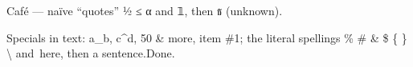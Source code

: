 Café — naïve “quotes” ½ ≤ α and 𝟙, then ธ (unknown).

Specials in text: a\_b, c\textasciicircum{}d, 50 \& more, item \#1; the literal spellings
\% \# \& \$ \{ \} \textbackslash{} and~here, then a sentence.\@ Done.
\RequirePackage{newunicodechar}
\RequirePackage{dsfont}
\endinput
